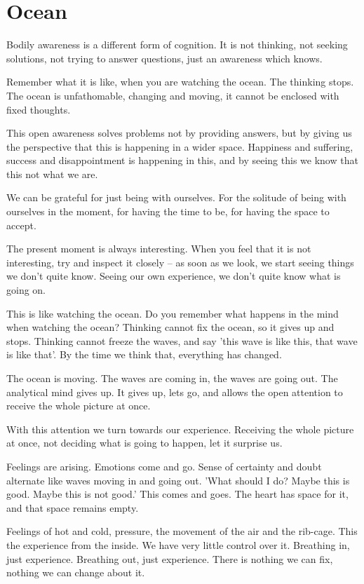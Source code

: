\hypertarget{ocean-1}{%
\chapter{Ocean}\label{ocean-1}}

Bodily awareness is a different form of cognition. It is not thinking,
not seeking solutions, not trying to answer questions, just an awareness
which knows.

Remember what it is like, when you are watching the ocean. The thinking
stops. The ocean is unfathomable, changing and moving, it cannot be
enclosed with fixed thoughts.

This open awareness solves problems not by providing answers, but by
giving us the perspective that this is happening in a wider space.
Happiness and suffering, success and disappointment is happening in
this, and by seeing this we know that this not what we are.

We can be grateful for just being with ourselves. For the solitude of
being with ourselves in the moment, for having the time to be, for
having the space to accept.

The present moment is always interesting. When you feel that it is not
interesting, try and inspect it closely -- as soon as we look, we start
seeing things we don't quite know. Seeing our own experience, we don't
quite know what is going on.

This is like watching the ocean. Do you remember what happens in the
mind when watching the ocean? Thinking cannot fix the ocean, so it gives
up and stops. Thinking cannot freeze the waves, and say 'this wave is
like this, that wave is like that'. By the time we think that,
everything has changed.

The ocean is moving. The waves are coming in, the waves are going out.
The analytical mind gives up. It gives up, lets go, and allows the open
attention to receive the whole picture at once.

With this attention we turn towards our experience. Receiving the whole
picture at once, not deciding what is going to happen, let it surprise
us.

Feelings are arising. Emotions come and go. Sense of certainty and doubt
alternate like waves moving in and going out. 'What should I do? Maybe
this is good. Maybe this is not good.' This comes and goes. The heart
has space for it, and that space remains empty.

Feelings of hot and cold, pressure, the movement of the air and the
rib-cage. This the experience from the inside. We have very little
control over it. Breathing in, just experience. Breathing out, just
experience. There is nothing we can fix, nothing we can change about it.

